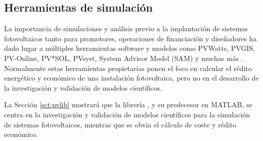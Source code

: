 \subsection{Herramientas de simulación}

La importancia de simulaciones y análisis previo a la implantación de sistemas fotovoltaicos tanto para promotores, operaciones de financiación y diseñadores ha dado lugar a múltiples herramientas \gls{software} y modelos como PVWatts, PVGIS, PV-Online, PV*SOL, PVsyst, System Advisor Model (SAM) y muchas más \cite{stein_models_2009, Kumar_2017}. Normalmente estas herramientas propietarias ponen el foco en calcular el rédito energético y económico de una instalación fotovoltaica, pero no en el desarrollo de la investigación y validación de modelos científicos.

La Sección \ref{sct:pvlib} mostrará que la librería \pvlibpy, y su predecesor en \gls{MATLAB}, se centra en la investigación y validación de modelos científicos para la simulación de sistemas fotovoltaicos, mientras que se obvia el cálculo de coste y rédito económico.
